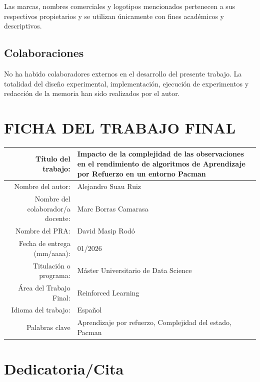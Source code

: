 Las marcas, nombres comerciales y logotipos mencionados pertenecen a sus respectivos propietarios y se utilizan únicamente con fines académicos y descriptivos.

\section*{Colaboraciones}

No ha habido colaboradores externos en el desarrollo del presente trabajo. La totalidad del diseño experimental, implementación, ejecución de experimentos y redacción de la memoria han sido realizados por el autor.

\chapter*{FICHA DEL TRABAJO FINAL}

\begin{table}[ht]
	\centering{}
	\renewcommand{\arraystretch}{2}
	\begin{tabular}{r | l}
		\hline
		Título del trabajo: & Impacto de la complejidad de las observaciones en el rendimiento de algoritmos de Aprendizaje por Refuerzo en un entorno Pacman\\
		\hline
        Nombre del autor: & Alejandro Suau Ruiz\\
		\hline
        Nombre del colaborador/a docente: & Marc Borras Camarasa\\
		\hline
        Nombre del PRA: & David Masip Rodó\\
		\hline
        Fecha de entrega (mm/aaaa): & 01/2026\\
		\hline
        Titulación o programa: & Máster Universitario de Data Science\\
		\hline
        Área del Trabajo Final: & Reinforced Learning\\
		\hline
        Idioma del trabajo: & Español\\
		\hline
        Palabras clave & Aprendizaje por refuerzo, Complejidad del estado, Pacman\\
		\hline
	\end{tabular}
\end{table}

\chapter*{Dedicatoria/Cita}


